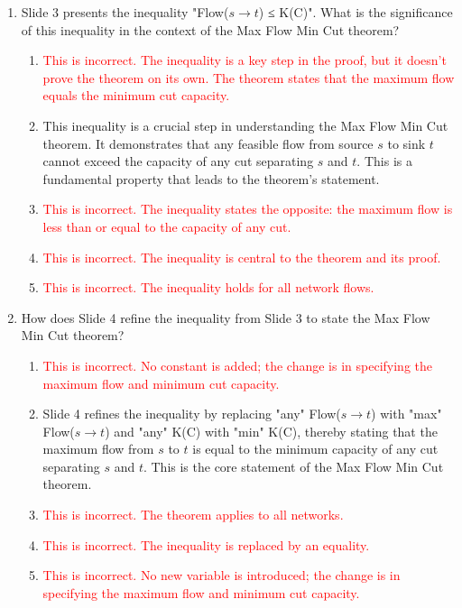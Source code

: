 \documentclass{article}%
\newcommand{\incorrect}[1]{\textcolor{red}{#1}}
\begin{document}
\begin{enumerate}
\item Slide 3 presents the inequality "Flow($s \to t$) ≤ K(C)". What is the significance of this inequality in the context of the Max Flow Min Cut theorem?%
\begin{enumerate}%
\item \incorrect{This is incorrect. The inequality is a key step in the proof, but it doesn't prove the theorem on its own. The theorem states that the maximum flow equals the minimum cut capacity.}%
\item This inequality is a crucial step in understanding the Max Flow Min Cut theorem. It demonstrates that any feasible flow from source $s$ to sink $t$ cannot exceed the capacity of any cut separating $s$ and $t$. This is a fundamental property that leads to the theorem's statement.%
\item \incorrect{This is incorrect. The inequality states the opposite: the maximum flow is less than or equal to the capacity of any cut.}%
\item \incorrect{This is incorrect. The inequality is central to the theorem and its proof.}%
\item \incorrect{This is incorrect. The inequality holds for all network flows.}%
\end{enumerate}%
\vspace{1em}%
\item How does Slide 4 refine the inequality from Slide 3 to state the Max Flow Min Cut theorem?%
\begin{enumerate}%
\item \incorrect{This is incorrect.  No constant is added; the change is in specifying the maximum flow and minimum cut capacity.}%
\item Slide 4 refines the inequality by replacing "any" Flow($s \to t$) with "max" Flow($s \to t$) and "any" K(C) with "min" K(C), thereby stating that the maximum flow from $s$ to $t$ is equal to the minimum capacity of any cut separating $s$ and $t$. This is the core statement of the Max Flow Min Cut theorem.%
\item \incorrect{This is incorrect. The theorem applies to all networks.}%
\item \incorrect{This is incorrect. The inequality is replaced by an equality.}%
\item \incorrect{This is incorrect. No new variable is introduced; the change is in specifying the maximum flow and minimum cut capacity.}%
\end{enumerate}%
\vspace{1em}%

\end{enumerate}
\end{document}
